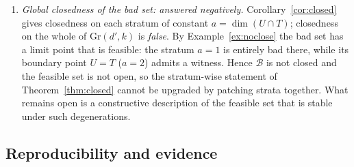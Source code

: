 \documentclass[journal]{IEEEtran}
\theoremstyle{plainn}
\theoremstyle{remark}
\begin{document}
\begin{enumerate}[label=(\Alph*),leftmargin=2.2em,itemsep=2pt]
problem this paper analyses; a single stratum where the containment can be tested in polynomial time, or a
single reduction, would be the decisive step.
\item \emph{Global closedness of the bad set: answered negatively.} Corollary~\ref{cor:closed} gives
closedness on each stratum of constant $a=\dim(U\cap T)$; closedness on the whole of
$\mathrm{Gr}(d',k)$ is \emph{false}. By Example~\ref{ex:noclose} the bad set has a limit point that is
feasible: the stratum $a=1$ is entirely bad there, while its boundary point $U=T$ ($a=2$) admits a
witness. Hence $\mathcal B$ is not closed and the feasible set is not open, so the stratum-wise
statement of Theorem~\ref{thm:closed} cannot be upgraded by patching strata together. What remains
open is a constructive description of the feasible set that is stable under such degenerations.
\end{enumerate}

\subsection{Reproducibility and evidence}\label{sec:repro}
\end{document}
